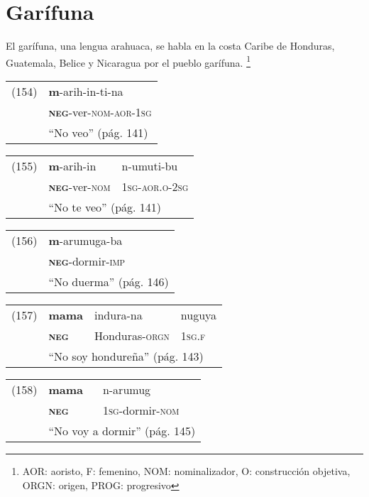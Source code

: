 \section*{Garífuna}

\noindent El garífuna, una lengua arahuaca, se habla en la costa Caribe de Honduras, Guatemala, Belice y Nicaragua por el pueblo garífuna.
\footnote{AOR: aoristo, F: femenino, NOM: nominalizador, O: construcción objetiva, ORGN: origen, PROG: progresivo}
\vspace{0.4cm} 

{\setmainfont{Charis SIL} 

\begin{tabular}{ll}
(154) & \textbf{m}-arih-in-ti-na \\
& \textsc{\textbf{neg}}-ver-\textsc{nom-aor-1sg}\\
& ``No veo'' (pág. 141)
\end{tabular} \vspace{0.2cm}

\begin{tabular}{lll}
(155) & \textbf{m}-arih-in & n-umuti-bu \\
& \textsc{\textbf{neg}}-ver-\textsc{nom} & \textsc{1sg-aor.o-2sg} \\
& \multicolumn{2}{l}{``No te veo'' (pág. 141)}
\end{tabular} \vspace{0.2cm}

\begin{tabular}{ll}
(156) & \textbf{m}-arumuga-ba \\
& \textsc{\textbf{neg}}-dormir-\textsc{imp} \\
& ``No duerma'' (pág. 146)
\end{tabular} \vspace{0.2cm}

\begin{tabular}{llll}
(157) & \textbf{mama} & indura-na & nuguya \\
& \textsc{\textbf{neg}} & Honduras-\textsc{orgn} & \textsc{1sg.f} \\
& \multicolumn{3}{l}{``No soy hondureña'' (pág. 143)}
\end{tabular} \vspace{0.2cm}

\begin{tabular}{lll}
(158) & \textbf{mama} & n-arumug \\
& \textsc{\textbf{neg}} & \textsc{1sg}-dormir-\textsc{nom} \\
& \multicolumn{2}{l}{``No voy a dormir'' (pág. 145)}
\end{tabular} \vspace{0.2cm}

}
